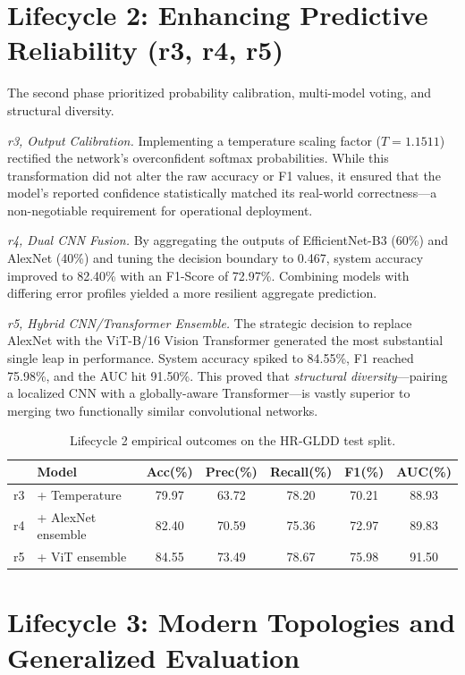 \documentclass[12pt,a4paper]{report}
\begin{document}
\section{Lifecycle 2: Enhancing Predictive Reliability (r3, r4, r5)}
The second phase prioritized probability calibration, multi-model voting, and structural diversity.

\textit{r3, Output Calibration.} Implementing a temperature scaling factor ($T = 1.1511$) rectified the network's overconfident softmax probabilities. While this transformation did not alter the raw accuracy or F1 values, it ensured that the model's reported confidence statistically matched its real-world correctness—a non-negotiable requirement for operational deployment.

\textit{r4, Dual CNN Fusion.} By aggregating the outputs of EfficientNet-B3 (60\%) and AlexNet (40\%) and tuning the decision boundary to 0.467, system accuracy improved to 82.40\% with an F1-Score of 72.97\%. Combining models with differing error profiles yielded a more resilient aggregate prediction.

\textit{r5, Hybrid CNN/Transformer Ensemble.} The strategic decision to replace AlexNet with the ViT-B/16 Vision Transformer generated the most substantial single leap in performance. System accuracy spiked to 84.55\%, F1 reached 75.98\%, and the AUC hit 91.50\%. This proved that \textit{structural diversity}—pairing a localized CNN with a globally-aware Transformer—is vastly superior to merging two functionally similar convolutional networks.

\begin{table}[H]
\begin{center}
\caption{Lifecycle 2 empirical outcomes on the HR-GLDD test split.}\label{tab:lc2}
\begin{tabular}{llccccc}
\hline
& {\bf Model} & {\bf Acc(\%)} & {\bf Prec(\%)} & {\bf Recall(\%)} & {\bf F1(\%)} & {\bf AUC(\%)} \\
\hline
r3 & + Temperature & 79.97 & 63.72 & 78.20 & 70.21 & 88.93 \\
r4 & + AlexNet ensemble & 82.40 & 70.59 & 75.36 & 72.97 & 89.83 \\
r5 & + ViT ensemble & 84.55 & 73.49 & 78.67 & 75.98 & 91.50 \\
\hline
\end{tabular}
\end{center}
\end{table}

\section{Lifecycle 3: Modern Topologies and Generalized Evaluation}
\end{document}
